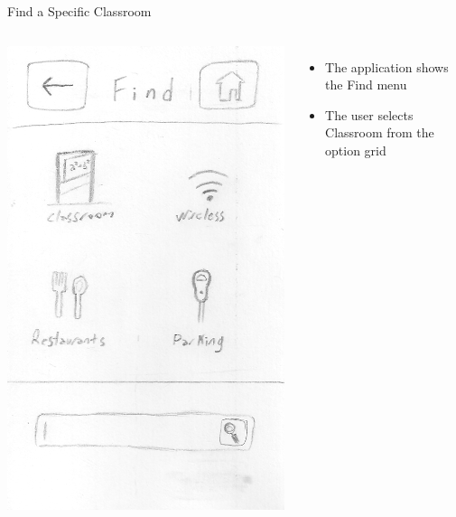 \documentclass{beamer}
\begin{document}
\begin{frame}{Find a Specific Classroom}
    \begin{columns}[c]
        \center\includegraphics[height=0.75 \textheight]{hand-drawn/find.png}
        \begin{itemize}
            \item The application shows the Find menu
            \item The user selects Classroom from the option grid
        \end{itemize}
    \end{columns}
\end{frame}
\end{document}
